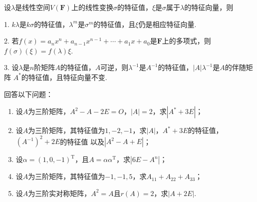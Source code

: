 设$\lambda$是线性空间$V(\mathbf{F})$上的线性变换$\sigma$的特征值，$\xi$是$\sigma$属于$\lambda$的特征向量，则

1. $k\lambda$是$k\sigma$的特征值，$\lambda^m$是$\sigma^m$的特征值，且$\xi$仍是相应特征向量.

2. 若$f(x)=a_nx^n+a_{n-1}x^{n-1}+\cdots+a_1x+a_0$是$\mathbf{F}$上的多项式，则$f(\sigma)(\xi)=f(\lambda)\xi$.

3. 设$\lambda$是$n$阶矩阵$A$的特征值，$A$可逆，则$\lambda^{-1}$是$A^{-1}$的特征值，$|A|\lambda^{-1}$是$A$的伴随矩阵
$A^*$的特征值，且特征向量不变.
\begin{example}
    回答以下问题：
    \begin{enumerate}
        \item 设$A$为三阶矩阵，$A^2-A-2E=O$，$|A|=2$，求$|A^*+3E|$；

        \item 设$A$为三阶矩阵，其特征值为$1,-2,-1$，求$|A|$，$A^*+3E$的特征值，$(A^{-1})^2+2E$的特征值
            以及$|A^2-A+E|$；

        \item 设$\alpha=(1,0,-1)^\mathrm{T}$，且$A=\alpha\alpha^\mathrm{T}$，求$|6E-A^n|$；

        \item 设$A$为三阶矩阵，其特征值为$-1,-1,5$，求$A_{11}+A_{22}+A_{33}$；

        \item 设$A$为三阶实对称矩阵，$A^2=A$且$r(A)=2$，求$|A+2E|$.
    \end{enumerate}
\end{example}

